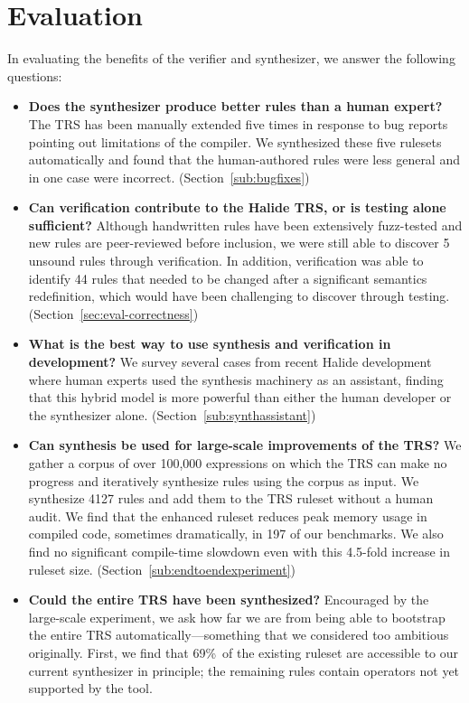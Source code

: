 \documentclass[acmsmall,review,anonymous]{acmart}\settopmatter{printfolios=true,printccs=false,printacmref=false}
\begin{document}
\section{Evaluation}

\newcommand{\PercentPossibleToSynth}{69\%}
\newcommand{\NumRulesInCorrectnessExperiment}{321}
\newcommand{\PercentRulesResynthesized}{58\%}

In evaluating the benefits of the verifier and synthesizer, we answer the following questions:

\begin{itemize}
  \item \textbf{Does the synthesizer produce better rules than a human expert?} The TRS has been manually extended five times in response to bug reports pointing out limitations of the compiler. We synthesized these five rulesets automatically and found that the human-authored rules were less general and in one case were incorrect. (Section~\ref{sub:bugfixes})
  \item \textbf{Can verification contribute to the Halide TRS, or is testing alone sufficient?} Although handwritten rules have been extensively fuzz-tested and new rules are peer-reviewed before inclusion, we were still able to discover 5 unsound rules through verification. In addition, verification was able to identify 44 rules that needed to be changed after a significant semantics redefinition, which would have been challenging to discover through testing. (Section~\ref{sec:eval-correctness})
  \item \textbf{What is the best way to use synthesis and verification in development?} We survey several cases from recent Halide development where human experts used the synthesis machinery as an assistant, finding that this hybrid model is more powerful than either the human developer or the synthesizer alone. (Section~\ref{sub:synthassistant})
  \item \textbf{Can synthesis be used for large-scale improvements of the TRS?} We gather a corpus of over 100,000 expressions on which the TRS can make no progress and iteratively synthesize rules using the corpus as input. We synthesize 4127 rules and add them to the TRS ruleset without a human audit. We find that the enhanced ruleset reduces peak memory usage in compiled code, sometimes dramatically, in 197 of our benchmarks. We also find no significant compile-time slowdown even with this 4.5-fold increase in ruleset size. (Section~\ref{sub:endtoendexperiment})
  \item \textbf{Could the entire TRS have been synthesized?} Encouraged by the large-scale experiment, we ask how far we are from being able to bootstrap the entire TRS automatically---something that we considered too ambitious originally. First, we find that \PercentPossibleToSynth~of the existing ruleset are accessible to our current synthesizer in principle; the remaining rules contain operators not yet supported by the tool. %

\end{itemize}
\end{document}

